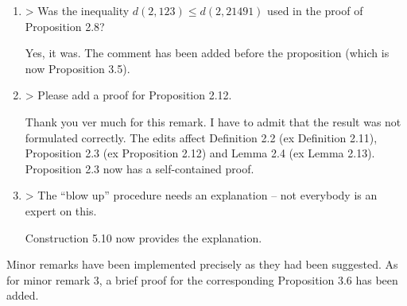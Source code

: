 \documentclass[a4paper,14pt]{article} %
\begin{document}
\begin{enumerate}
	\item

		> Was the inequality $d(2, 123) \leq d(2, 21491)$ used in the proof of Proposition 2.8?

		Yes, it was.
		The comment has been added before the proposition (which is now Proposition 3.5).


	\item

		> Please add a proof for Proposition 2.12.

		Thank you ver much for this remark.
		I have to admit that the result was not formulated correctly.
		The edits affect Definition 2.2 (ex Definition 2.11), Proposition 2.3 (ex Proposition 2.12) and Lemma 2.4 (ex Lemma 2.13).
		Proposition 2.3 now has a self-contained proof.

	\item

		> The “blow up” procedure needs an explanation – not everybody is an expert on this.

		Construction 5.10 now provides the explanation.

\end{enumerate}

Minor remarks have been implemented precisely as they had been suggested.
As for minor remark 3, a brief proof for the corresponding Proposition 3.6 has been added.







\end{document}
